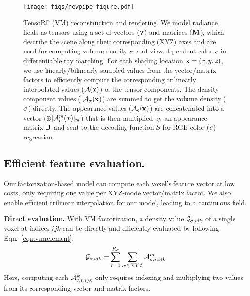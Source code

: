 \documentclass[runningheads]{llncs}
\newcommand{\boldstartspace}[1]{\vspace{0.1in}\noindent\textbf{#1}}
\begin{document}
\begin{figure*}[t]
    \texttt{[image: figs/newpipe-figure.pdf]}
\caption{TensoRF (VM) reconstruction and rendering. We model radiance fields as tensors using a set of vectors ($\mathbf{v}$) and matrices ($\mathbf{M}$), which describe the scene along their corresponding (XYZ) axes and are used for computing volume density $\sigma$ and view-dependent color $c$ in differentiable ray marching.
For each shading location $\mathbf{x}=(x,y,z)$, we use linearly/bilinearly sampled values from the vector/matrix factors to efficiently compute the corresponding trilinearly interpolated values ($\mathcal{A}(\mathbf{x})$) of the tensor components. The density component values ( $\mathcal{A}_\sigma(\mathbf{x})$) are summed 
    to get the volume density ($\sigma$) directly. 
The appearance values ($\mathcal{A}_c(\mathbf{x})$) are concatenated into a vector ($\oplus[\mathcal{A}_c^m(x)]_m$) that is then multiplied by an appearance matrix $\mathbf{B}$ and sent to the decoding function $S$ for RGB color ($c$) regression. 
}
    \label{fig:pipeline}\vspace{-5mm}
\end{figure*}


\subsection{Efficient feature evaluation.}


Our factorization-based model can compute each voxel's feature vector at low costs, only requiring one value per XYZ-mode vector/matrix factor.
We also enable efficient trilinear interpolation for our model, leading to a continuous field.  

\boldstartspace{Direct evaluation.}
With VM factorization, a density value $\mathcal{G}_{\sigma,ijk}$ of a single voxel at indices $ijk$ can be directly and efficiently evaluated by following Eqn.~\ref{eqn:vmrelement}:
\begin{align}
    \mathcal{G}_{\sigma,ijk} =  \sum_{r=1}^{R_\sigma} \sum_{m\in XYZ} \mathcal{A}^m_{\sigma,r,ijk}
    \label{eqn:dens-vmrelement}
\end{align}
Here, computing each $\mathcal{A}^m_{\sigma,r,ijk}$ only requires indexing and multiplying two values from its corresponding vector and matrix factors.
\end{document}
